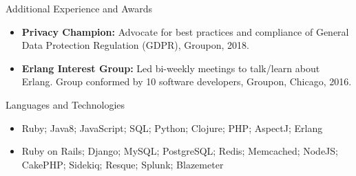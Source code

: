 \documentclass[]{mcdowellcv}
\begin{document}
	
	\begin{cvsection}{Additional Experience and Awards}
		\begin{cvsubsection}{}{}{}	
			\begin{itemize}
			        \item \textbf{Privacy Champion:} Advocate for best practices and compliance of General Data Protection Regulation (GDPR), Groupon, 2018.
			        \item \textbf{Erlang Interest Group:} Led bi-weekly meetings to talk/learn about Erlang. Group conformed by 10 software developers, Groupon, Chicago, 2016.
			\end{itemize}
		\end{cvsubsection}
	\end{cvsection}
	
	\begin{cvsection}{Languages and Technologies}
		\begin{cvsubsection}{}{}{}	
			\begin{itemize}
				\item Ruby; Java8; JavaScript; SQL; Python; Clojure; PHP; AspectJ; Erlang 
				\item Ruby on Rails; Django; MySQL; PostgreSQL; Redis; Memcached; NodeJS; CakePHP; Sidekiq; Resque; Splunk; Blazemeter
			\end{itemize}
		\end{cvsubsection}
	\end{cvsection}
\end{document}
